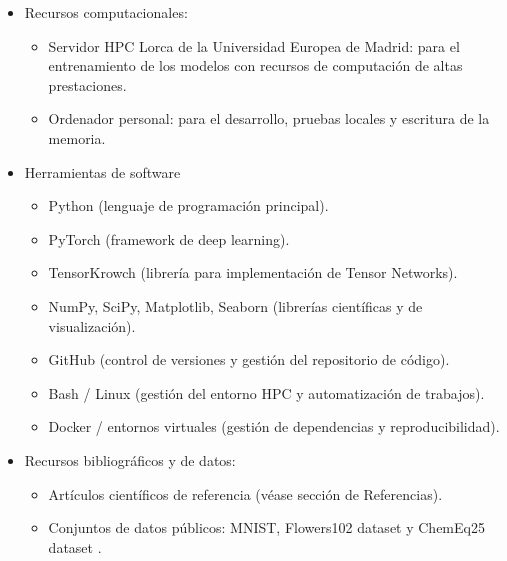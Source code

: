 \begin{itemize}
	
	\item Recursos computacionales:
	\begin{itemize}
    		\item Servidor HPC Lorca de la Universidad Europea de Madrid: para el entrenamiento de los modelos con recursos de computación de altas prestaciones.
    		\item Ordenador personal: para el desarrollo, pruebas locales y escritura de la memoria.
	\end{itemize}

	\item Herramientas de software
	\begin{itemize}
   		\item Python (lenguaje de programación principal).
   		 \item PyTorch (framework de deep learning).
    		\item TensorKrowch (librería para implementación de Tensor Networks).
   		 \item NumPy, SciPy, Matplotlib, Seaborn (librerías científicas y de visualización).
    		\item GitHub (control de versiones y gestión del repositorio de código).
    		\item Bash / Linux (gestión del entorno HPC y automatización de trabajos).
    		\item Docker / entornos virtuales (gestión de dependencias y reproducibilidad).
	\end{itemize}

	\item Recursos bibliográficos y de datos:
	\begin{itemize}
   		\item Artículos científicos de referencia (véase sección de Referencias).
   		\item Conjuntos de datos públicos: MNIST, Flowers102 dataset y ChemEq25 dataset .
	\end{itemize}
	
\end{itemize}
